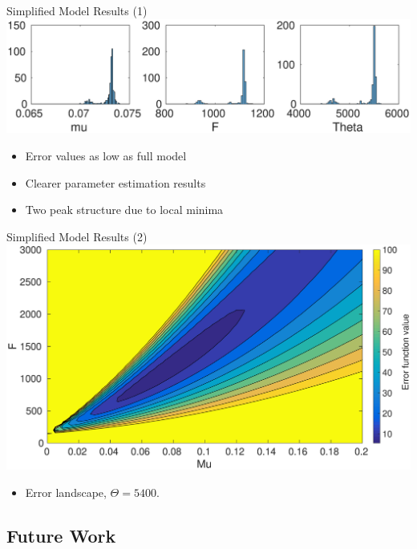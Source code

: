 \documentclass{beamer}
\begin{document}
\begin{frame}{Simplified Model Results (1)}
  \includegraphics[scale = 0.29, clip = true, trim = 100 0 0 400]{Figures/13_9_hist_simplified}
  \begin{itemize}
\item  Error values as low as full model
\item Clearer parameter estimation results
\item Two peak structure due to local minima
\end{itemize}
\end{frame}

\begin{frame}{Simplified Model Results (2)}
  \includegraphics[scale = 0.26, clip = true, trim = 40 0 0 0]{Figures/Likelihood_rough_presentation}
    \begin{itemize}
\item  Error landscape, $\Theta = 5400$.
\end{itemize}
\end{frame}

\subsection{Future Work}
\end{document}
